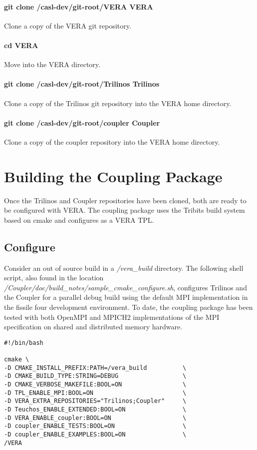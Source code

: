 \documentclass[letterpaper]{article}
\begin{document}
\paragraph{git clone /casl-dev/git-root/VERA VERA}
Clone a copy of the VERA git repository.

\paragraph{cd VERA}
Move into the VERA directory.

\paragraph{git clone /casl-dev/git-root/Trilinos Trilinos}
Clone a copy of the Trilinos git repository into the VERA home
directory. 

\paragraph{git clone /casl-dev/git-root/coupler Coupler} 
Clone a copy of the coupler repository into the VERA home
directory.

\section{Building the Coupling Package}
Once the Trilinos and Coupler repositories have been cloned, both are
ready to be configured with VERA. The coupling package uses the
Tribits build system based on cmake and configures as a VERA TPL.

\subsection{Configure}
Consider an out of source build in a {\sl /vera\_build} directory. The
following shell script, also found in the location
{\sl /Coupler/doc/build\_notes/sample\_cmake\_configure.sh}, configures
Trilinos and the Coupler for a parallel debug build using the default MPI
implementation in the fissile four development environment. To date,
the coupling package has been tested with both OpenMPI and MPICH2
implementations of the MPI specification on shared and distributed
memory hardware.  

\begin{verbatim}
#!/bin/bash

cmake \
-D CMAKE_INSTALL_PREFIX:PATH=/vera_build          \
-D CMAKE_BUILD_TYPE:STRING=DEBUG                  \
-D CMAKE_VERBOSE_MAKEFILE:BOOL=ON                 \
-D TPL_ENABLE_MPI:BOOL=ON                         \
-D VERA_EXTRA_REPOSITORIES="Trilinos;Coupler"     \
-D Teuchos_ENABLE_EXTENDED:BOOL=ON                \
-D VERA_ENABLE_coupler:BOOL=ON                    \
-D coupler_ENABLE_TESTS:BOOL=ON                   \
-D coupler_ENABLE_EXAMPLES:BOOL=ON                \
/VERA
\end{verbatim}
\end{document}
